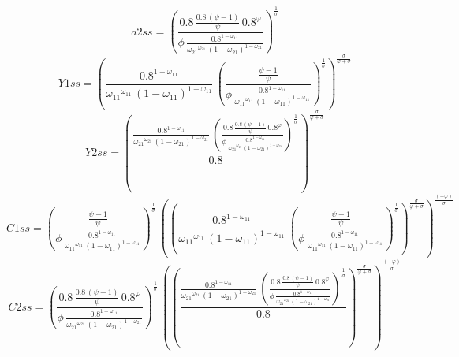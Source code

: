\begin{dmath*}
a2ss = \left(\frac{0.8\, \frac{0.8\, \left({{\psi}}-1\right)}{{{\psi}}}\, 0.8^{{{\varphi}}}}{{{\phi}}\, \frac{0.8^{1-{{\omega_{11}}}}}{{{\omega_{21}}}^{{{\omega_{21}}}}\, \left(1-{{\omega_{21}}}\right)^{1-{{\omega_{21}}}}}}\right)^{\frac{1}{{{\sigma}}}}
\end{dmath*}
\begin{dmath*}
Y1ss = \left(\frac{0.8^{1-{{\omega_{11}}}}}{{{\omega_{11}}}^{{{\omega_{11}}}}\, \left(1-{{\omega_{11}}}\right)^{1-{{\omega_{11}}}}}\, \left(\frac{\frac{{{\psi}}-1}{{{\psi}}}}{{{\phi}}\, \frac{0.8^{1-{{\omega_{11}}}}}{{{\omega_{11}}}^{{{\omega_{11}}}}\, \left(1-{{\omega_{11}}}\right)^{1-{{\omega_{11}}}}}}\right)^{\frac{1}{{{\sigma}}}}\right)^{\frac{{{\sigma}}}{{{\varphi}}+{{\sigma}}}}
\end{dmath*}
\begin{dmath*}
Y2ss = \left(\frac{\frac{0.8^{1-{{\omega_{11}}}}}{{{\omega_{21}}}^{{{\omega_{21}}}}\, \left(1-{{\omega_{21}}}\right)^{1-{{\omega_{21}}}}}\, \left(\frac{0.8\, \frac{0.8\, \left({{\psi}}-1\right)}{{{\psi}}}\, 0.8^{{{\varphi}}}}{{{\phi}}\, \frac{0.8^{1-{{\omega_{11}}}}}{{{\omega_{21}}}^{{{\omega_{21}}}}\, \left(1-{{\omega_{21}}}\right)^{1-{{\omega_{21}}}}}}\right)^{\frac{1}{{{\sigma}}}}}{0.8}\right)^{\frac{{{\sigma}}}{{{\varphi}}+{{\sigma}}}}
\end{dmath*}
\begin{dmath*}
C1ss = \left(\frac{\frac{{{\psi}}-1}{{{\psi}}}}{{{\phi}}\, \frac{0.8^{1-{{\omega_{11}}}}}{{{\omega_{11}}}^{{{\omega_{11}}}}\, \left(1-{{\omega_{11}}}\right)^{1-{{\omega_{11}}}}}}\right)^{\frac{1}{{{\sigma}}}}\, \left(\left(\frac{0.8^{1-{{\omega_{11}}}}}{{{\omega_{11}}}^{{{\omega_{11}}}}\, \left(1-{{\omega_{11}}}\right)^{1-{{\omega_{11}}}}}\, \left(\frac{\frac{{{\psi}}-1}{{{\psi}}}}{{{\phi}}\, \frac{0.8^{1-{{\omega_{11}}}}}{{{\omega_{11}}}^{{{\omega_{11}}}}\, \left(1-{{\omega_{11}}}\right)^{1-{{\omega_{11}}}}}}\right)^{\frac{1}{{{\sigma}}}}\right)^{\frac{{{\sigma}}}{{{\varphi}}+{{\sigma}}}}\right)^{\frac{\left(-{{\varphi}}\right)}{{{\sigma}}}}
\end{dmath*}
\begin{dmath*}
C2ss = \left(\frac{0.8\, \frac{0.8\, \left({{\psi}}-1\right)}{{{\psi}}}\, 0.8^{{{\varphi}}}}{{{\phi}}\, \frac{0.8^{1-{{\omega_{11}}}}}{{{\omega_{21}}}^{{{\omega_{21}}}}\, \left(1-{{\omega_{21}}}\right)^{1-{{\omega_{21}}}}}}\right)^{\frac{1}{{{\sigma}}}}\, \left(\left(\frac{\frac{0.8^{1-{{\omega_{11}}}}}{{{\omega_{21}}}^{{{\omega_{21}}}}\, \left(1-{{\omega_{21}}}\right)^{1-{{\omega_{21}}}}}\, \left(\frac{0.8\, \frac{0.8\, \left({{\psi}}-1\right)}{{{\psi}}}\, 0.8^{{{\varphi}}}}{{{\phi}}\, \frac{0.8^{1-{{\omega_{11}}}}}{{{\omega_{21}}}^{{{\omega_{21}}}}\, \left(1-{{\omega_{21}}}\right)^{1-{{\omega_{21}}}}}}\right)^{\frac{1}{{{\sigma}}}}}{0.8}\right)^{\frac{{{\sigma}}}{{{\varphi}}+{{\sigma}}}}\right)^{\frac{\left(-{{\varphi}}\right)}{{{\sigma}}}}
\end{dmath*}
